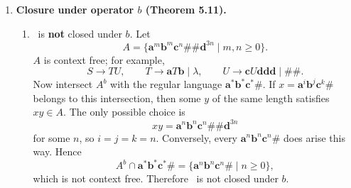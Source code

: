 \begin{enumerate}[{10.}1. ]
\begin{enumerate}
\item \textbf{\PSIG\ is not closed under quotient}: Let
\[
L=\{\pmb{a}^n\pmb{b}^n\pmb{c}^{n+m}\pmb{d}^m\mid n,m\geq 0\}
\qquad\text{and}\qquad
K=\{\pmb{c}^m\pmb{d}^m\mid m\geq 0\}.
\]
The language $K$ is context free. So is $L$: a PDA pushes one marker for each $\pmb{a}$, and on each $\pmb{b}$ replaces one such marker by a marker that must later be matched by a $\pmb{c}$. After those forced $\pmb{c}$'s have been read, any additional $\pmb{c}$'s are counted against the final $\pmb{d}$'s. Now
\[
L/K=\{\pmb{a}^n\pmb{b}^n\pmb{c}^n\mid n\geq 0\}.
\]
Indeed, every $\pmb{a}^n\pmb{b}^n\pmb{c}^n$ is in the quotient by taking the suffix $\lambda\in K$. Conversely, if $x\in L/K$, then $xy\in L$ for some $y=\pmb{c}^m\pmb{d}^m\in K$. Since every word of $L$ has the form $\pmb{a}^n\pmb{b}^n\pmb{c}^{n+r}\pmb{d}^r$, the suffix $\pmb{c}^m\pmb{d}^m$ can only begin after exactly the first $n$ $\pmb{c}$'s; otherwise the number of $\pmb{c}$'s preceding the $\pmb{d}$-block would exceed the number of trailing $\pmb{d}$'s. Hence $x=\pmb{a}^n\pmb{b}^n\pmb{c}^n$. But $\{\pmb{a}^n\pmb{b}^n\pmb{c}^n\mid n\geq 0\}$ is not context free, so \PSIG\ is not closed under quotient.

\item \textbf{\ASIG\ is not closed under quotient}: The same counterexample works for deterministic context-free languages, because both $L$ and $K$ are accepted by DPDAs. For $K$, use the standard DPDA for $\{\pmb{c}^m\pmb{d}^m\}$. For $L$, use the deterministic phase structure described above:
\[
\pmb{a}\text{-phase} \rightarrow \pmb{b}\text{-phase} \rightarrow
\text{forced }\pmb{c}\text{-phase} \rightarrow \text{extra }\pmb{c}\text{-phase}
\rightarrow \pmb{d}\text{-phase}.
\]
Thus $L,K\in\ASIG$, but
\[
L/K=\{\pmb{a}^n\pmb{b}^n\pmb{c}^n\mid n\geq 0\}
\]
is not even context free. Therefore \ASIG\ is not closed under quotient.
\end{enumerate}

\item \textbf{Closure under operator $b$ (Theorem 5.11).}

\begin{enumerate}
\item \PSIG\ is \textbf{not} closed under $b$. Let
\[
A=\{\pmb{a}^m\pmb{b}^m\pmb{c}^n\pmb{\#\#}\pmb{d}^{3n}\mid m,n\geq 0\}.
\]
$A$ is context free; for example,
\[
S\rightarrow TU,\qquad
T\rightarrow \pmb{a}T\pmb{b}\mid \lambda,\qquad
U\rightarrow \pmb{c}U\pmb{ddd}\mid \pmb{\#\#}.
\]
Now intersect $A^b$ with the regular language $\pmb{a}^*\pmb{b}^*\pmb{c}^*\pmb{\#}$.
If $x=\pmb{a}^i\pmb{b}^j\pmb{c}^k\pmb{\#}$ belongs to this intersection, then some $y$
of the same length satisfies $xy\in A$. The only possible choice is
\[
xy=\pmb{a}^n\pmb{b}^n\pmb{c}^n\pmb{\#\#}\pmb{d}^{3n}
\]
for some $n$, so $i=j=k=n$. Conversely, every $\pmb{a}^n\pmb{b}^n\pmb{c}^n\pmb{\#}$
does arise this way. Hence
\[
A^b\cap \pmb{a}^*\pmb{b}^*\pmb{c}^*\pmb{\#}
=\{\pmb{a}^n\pmb{b}^n\pmb{c}^n\pmb{\#}\mid n\geq 0\},
\]
which is not context free. Therefore \PSIG\ is not closed under $b$.


\end{enumerate}
\end{enumerate}
